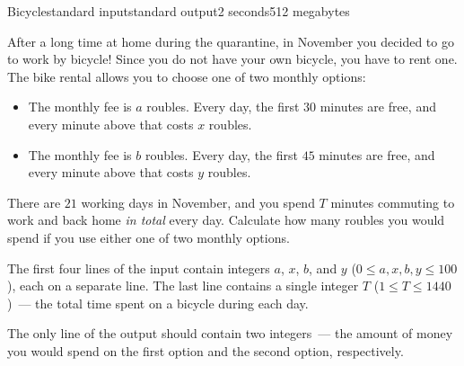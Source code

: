 \begin{problem}{Bicycle}{standard input}{standard output}{2 seconds}{512 megabytes}

After a long time at home during the quarantine, in November you decided to go to work by bicycle! Since you do not have your own bicycle, you have to rent one. The bike rental allows you to choose one of two monthly options:
\begin{itemize}
\item The monthly fee is $a$ roubles. Every day, the first $30$ minutes are free, and every minute above that costs $x$ roubles.
\item The monthly fee is $b$ roubles. Every day, the first $45$ minutes are free, and every minute above that costs $y$ roubles.
\end{itemize}

There are $21$ working days in November, and you spend $T$ minutes commuting to work and back home {\it in total} every day. Calculate how many roubles you would spend if you use either one of two monthly options.

\InputFile
The first four lines of the input contain integers $a$, $x$, $b$, and $y$ ($0 \leq a, x, b, y \leq 100$), each on a separate line. The last line contains a single integer $T$ ($1 \leq T \leq 1440$)~--- the total time spent on a bicycle during each day.

\OutputFile
The only line of the output should contain two integers~--- the amount of money you would spend on the first option and the second option, respectively.

\Examples

\begin{example}
%
%
%
\end{example}

\end{problem}

